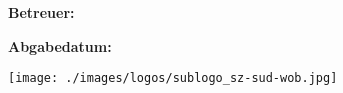 \begin{titlepage}

    \vfil

    \hspace{1cm}
    \begin{minipage}{\dimexpr\textwidth-1.5cm\relax}
        {\Large\textsf{
            }}

        \vspace{0.5cm}

        {\Large\textsf{
            \textbf{Betreuer:}
        }}

        \vspace{0.5cm}

        {\Large\textsf{
            \textbf{Abgabedatum:} \\\documentDate
        }}
    \end{minipage}

    \vfil


    \enlargethispage{5\baselineskip}

    \texttt{[image: ./images/logos/sublogo\_sz-sud-wob.jpg]}


\end{titlepage}

\restoregeometry